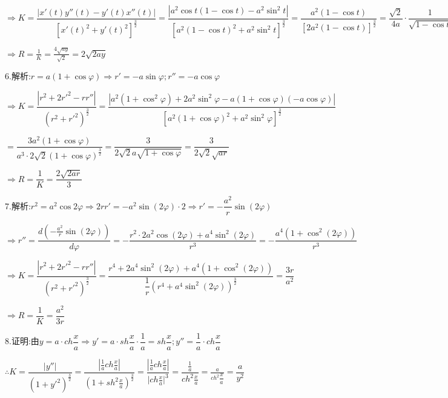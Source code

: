$ \Rightarrow K = \dfrac{{|x'(t)y''(t) - y'(t)x''(t)|}}{{{{\left[ {x'{{(t)}^2} + y'{{(t)}^2}} \right]}^{\frac{3}{2}}}}} = \dfrac{{|{a^2}\cos t(1 - \cos t) - {a^2}{{\sin }^2}t|}}{{{{\left[ {{a^2}{{(1 - \cos t)}^2} + {a^2}{{\sin }^2}t} \right]}^{\frac{3}{2}}}}} = \dfrac{{{a^2}(1 - \cos t)}}{{{{\left[ {2{a^2}(1 - \cos t)} \right]}^{\frac{3}{2}}}}} = \dfrac{{\sqrt 2 }}{{4a}} \cdot \dfrac{1}{{\sqrt {1 - \cos t} }} = \dfrac{{\sqrt 2 }}{{4\sqrt {ay} }}$

$ \Rightarrow R = \frac{1}{K} = \frac{{4\sqrt {ay} }}{{\sqrt 2 }} = 2\sqrt {2ay} $

6.解析:$r = a(1 + \cos \varphi ) \Rightarrow r' =  - a\sin \varphi ;r'' =  - a\cos \varphi $

$  \Rightarrow K = \dfrac{{|{r^2} + 2{{r'}^2} - rr''|}}{{{{({r^2} + {{r'}^2})}^{\frac{3}{2}}}}} = \dfrac{{|{a^2}(1 + {{\cos }^2}\varphi ) + 2{a^2}{{\sin }^2}\varphi  - a(1 + \cos \varphi )( - a\cos \varphi )|}}{{{{\left[ {{a^2}{{(1 + \cos \varphi )}^2} + {a^2}{{\sin }^2}\varphi } \right]}^{\frac{3}{2}}}}}$

$ = \dfrac{{3{a^2}(1 + \cos \varphi )}}{{{a^3} \cdot 2\sqrt 2 {{(1 + \cos \varphi )}^{\frac{3}{2}}}}} = \dfrac{3}{{2\sqrt 2 a\sqrt {1 + \cos \varphi } }} = \dfrac{3}{{2\sqrt 2 \sqrt {ar} }}$

$ \Rightarrow R = \dfrac{1}{K} = \dfrac{{2\sqrt {2ar} }}{3}$

7.解析:${r^2} = {a^2}\cos 2\varphi  \Rightarrow 2rr' =  - {a^2}\sin (2\varphi ) \cdot 2 \Rightarrow r' =  - \dfrac{{{a^2}}}{r}\sin (2\varphi )$

$ \Rightarrow r'' = \dfrac{{d( - \frac{{{a^2}}}{r}\sin (2\varphi ))}}{{d\varphi }} =  - \dfrac{{{r^2} \cdot 2{a^2}\cos (2\varphi ) + {a^4}{{\sin }^2}(2\varphi )}}{{{r^3}}} =  - \dfrac{{{a^4}(1 + {{\cos }^2}(2\varphi ))}}{{{r^3}}}$

$ \Rightarrow K = \dfrac{{|{r^2} + 2{{r'}^2} - rr''|}}{{{{({r^2} + {{r'}^2})}^{\frac{3}{2}}}}} = \dfrac{{{r^4} + 2{a^4}{{\sin }^2}(2\varphi ) + {a^4}(1 + {{\cos }^2}(2\varphi ))}}{{\dfrac{1}{r}{{({r^4} + {a^4}{{\sin }^2}(2\varphi ))}^{\frac{3}{2}}}}} = \dfrac{{3r}}{{{a^2}}}$

$ \Rightarrow R = \dfrac{1}{K} = \dfrac{{{a^2}}}{{3r}}$

8.证明:由$y = a \cdot ch\dfrac{x}{a} \Rightarrow y' = a \cdot sh\dfrac{x}{a} \cdot \dfrac{1}{a} = sh\dfrac{x}{a};y'' = \dfrac{1}{a} \cdot ch\dfrac{x}{a}$

$\therefore K = \dfrac{{|y''|}}{{{{(1 + {{y'}^2})}^{\frac{3}{2}}}}} = \dfrac{{|\frac{1}{a}ch\frac{x}{a}|}}{{{{(1 + s{h^2}\frac{x}{a})}^{\frac{3}{2}}}}} = \dfrac{{|\frac{1}{a}ch\frac{x}{a}|}}{{|ch\frac{x}{a}{|^3}}} = \dfrac{{\frac{1}{a}}}{{c{h^2}\frac{x}{a}}} = \frac{a}{{c{h^2}\dfrac{x}{a}}} = \dfrac{a}{{{y^2}}}$

